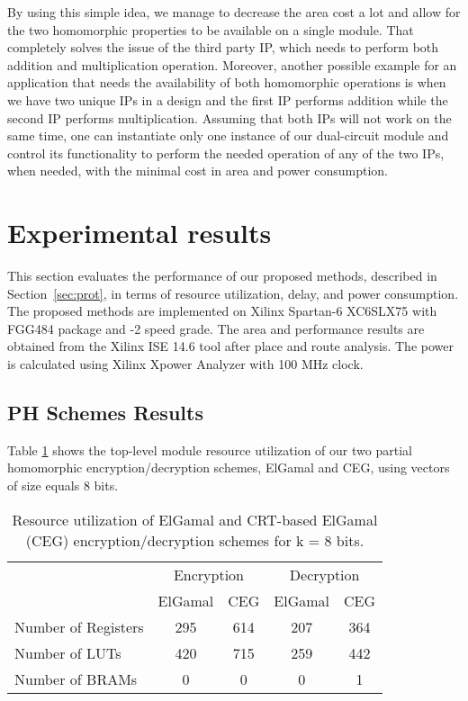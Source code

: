 \documentclass[conference]{IEEEtran}
\begin{document}
By using this simple idea, we manage to decrease the area cost a lot and allow for the two homomorphic properties to be available on a single module. That completely solves the issue of the third party IP, which needs to perform both addition and multiplication operation. Moreover, another possible example for an application that needs the availability of both homomorphic operations is when we have two unique IPs in a design and the first IP performs addition while the second IP performs multiplication. Assuming that both IPs will not work on the same time, one can instantiate only one instance of our dual-circuit module and control its functionality to perform the needed operation of any of the two IPs, when needed, with the minimal cost in area and power consumption.  

\section{Experimental results} \label{sec:expr}

This section evaluates the performance of our proposed methods, described in Section~\ref{sec:prot}, in terms of resource utilization, delay, and power consumption. The proposed methods are implemented on Xilinx Spartan-6 XC6SLX75 with FGG484 package and -2 speed grade. The area and performance results are obtained from the Xilinx ISE 14.6 tool after place and route analysis. The power is calculated using Xilinx Xpower Analyzer with 100 MHz clock.   

\subsection{PH Schemes Results}
Table \ref{tab:PartialRes} shows the top-level module resource utilization of our two partial homomorphic encryption/decryption schemes, ElGamal and CEG, using vectors of size equals 8 bits. 

\begin{table}[b]
  \centering
  \caption{Resource utilization of ElGamal and CRT-based ElGamal (CEG) encryption/decryption schemes for k = 8 bits.}
    \tabcolsep=0.11cm 
\begin{tabular}{|l||c|c||c|c|}
    \toprule
    & \multicolumn{2}{c}{Encryption }  & \multicolumn{2}{c}{Decryption} \vline\\
    & ElGamal  & CEG   & ElGamal  & CEG   \\
    \midrule
    Number of Registers & 295   & 614   & 207   & 364   \\
    Number of LUTs      & 420   & 715   & 259   & 442   \\
    Number of BRAMs     & 0     & 0     & 0     & 1     \\
    \bottomrule
    \end{tabular}\label{tab:PartialRes}\end{table}
\end{document}

